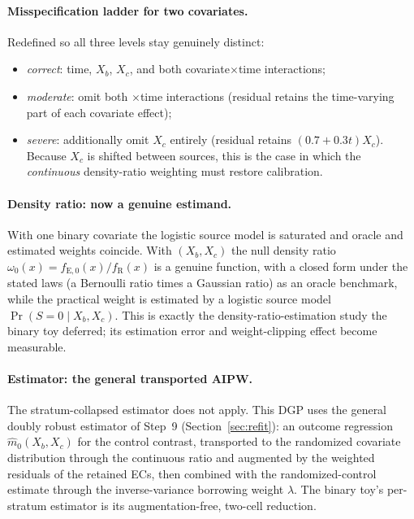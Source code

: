 \documentclass[11pt]{article}
\newcommand{\R}{\mathrm{R}}
\newcommand{\E}{\mathrm{E}}
\begin{document}
\paragraph{Misspecification ladder for two covariates.} Redefined so all three levels stay genuinely distinct:
\begin{itemize}
    \item \emph{correct}: time, $X_b$, $X_c$, and both covariate$\times$time interactions;
    \item \emph{moderate}: omit both $\times$time interactions (residual retains the time-varying part of each covariate effect);
    \item \emph{severe}: additionally omit $X_c$ entirely (residual retains $(0.7+0.3t)X_c$). Because $X_c$ is shifted between sources, this is the case in which the \emph{continuous} density-ratio weighting must restore calibration.
\end{itemize}

\paragraph{Density ratio: now a genuine estimand.} With one binary covariate the logistic source model is saturated and oracle and estimated weights coincide. With $(X_b,X_c)$ the null density ratio $\omega_0(x)=f_{\E,0}(x)/f_{\R}(x)$ is a genuine function, with a closed form under the stated laws (a Bernoulli ratio times a Gaussian ratio) as an oracle benchmark, while the practical weight is estimated by a logistic source model $\Pr(S{=}0\mid X_b,X_c)$. This is exactly the density-ratio-estimation study the binary toy deferred; its estimation error and weight-clipping effect become measurable.

\paragraph{Estimator: the general transported AIPW.} The stratum-collapsed estimator does not apply. This DGP uses the general doubly robust estimator of Step~9 (Section~\ref{sec:refit}): an outcome regression $\widehat m_0(X_b,X_c)$ for the control contrast, transported to the randomized covariate distribution through the continuous ratio and augmented by the weighted residuals of the retained ECs, then combined with the randomized-control estimate through the inverse-variance borrowing weight $\lambda$. The binary toy's per-stratum estimator is its augmentation-free, two-cell reduction.
\end{document}
